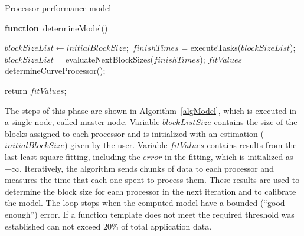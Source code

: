 \documentclass[journal]{IEEEtran}
\begin{document}





\begin{algorithm}

\caption{Processor performance model}
\label{algModel}

\begin{algorithmic}		

\STATE \textbf{function}~determineModel()

\STATE $blockSizeList \leftarrow initialBlockSize;$
		\STATE $finishTimes$ = executeTasks($blockSizeList$);
	        \STATE $blockSizeList$ = evaluateNextBlockSizes($finishTimes$);
		\STATE $fitValues$ = determineCurveProcessor();
\ENDWHILE

return $fitValues$;

\end{algorithmic}
\end{algorithm}


The steps of this phase are shown in Algorithm~\ref{algModel}, which is executed
in a single node, called master node. Variable $blockListSize$ contains the size
of the blocks assigned to each processor and is initialized with an estimation
($initialBlockSize$) given by the user. Variable $fitValues$ contains
results from the last least square fitting, including the $error$ in the
fitting, which is initialized as $+\infty$. Iteratively, the algorithm sends chunks of data to each processor and measures the time that each one spent to process them.  These results are used to determine the block size for each processor in the next iteration and to calibrate the model. The loop stops when the computed model have a bounded (``good enough'') error. If a function template does not meet the required threshold was established can not exceed 20\% of total application data.
\end{document}
